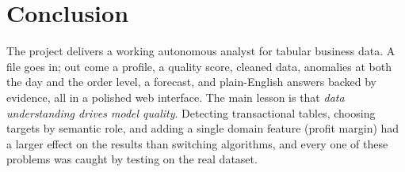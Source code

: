 \documentclass[11pt,a4paper]{article}
\begin{document}
\section{Conclusion}
The project delivers a working autonomous analyst for tabular business data. A file goes in; out come a profile,
a quality score, cleaned data, anomalies at both the day and the order level, a forecast, and plain-English
answers backed by evidence, all in a polished web interface. The main lesson is that \emph{data understanding
drives model quality}. Detecting transactional tables, choosing targets by semantic role, and adding a single
domain feature (profit margin) had a larger effect on the results than switching algorithms, and every one of
these problems was caught by testing on the real dataset.
\end{document}
